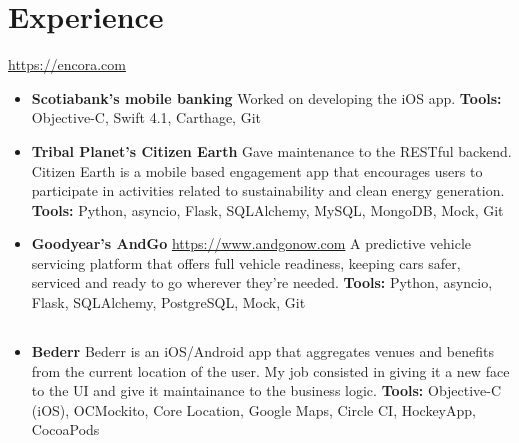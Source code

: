 \documentclass[11pt,a4paper,english]{moderncv}
\begin{document}
\maketitle

\section{Experience}

{
\url{https://encora.com}
\newline{}
\begin{itemize}
    \item \textbf{Scotiabank's mobile banking}
        \newline{}
	    Worked on developing the iOS app.
        \newline{}
        \textbf{Tools:} Objective-C, Swift 4.1, Carthage, Git
    \item \textbf{Tribal Planet's Citizen Earth}
        \newline{}
        Gave maintenance to the RESTful backend. Citizen Earth is a mobile based engagement app that encourages users to participate in activities related to sustainability and clean energy generation.
        \newline{}
        \textbf{Tools:} Python, asyncio, Flask, SQLAlchemy, MySQL, MongoDB, Mock, Git
    \item \textbf{Goodyear's AndGo}
        \newline{}
        \url{https://www.andgonow.com}
        \newline{}
        A predictive vehicle servicing platform that offers full vehicle readiness, keeping cars safer, serviced and ready to go wherever they’re needed.
        \newline{}
        \textbf{Tools:} Python, asyncio, Flask, SQLAlchemy, PostgreSQL, Mock, Git
\end{itemize}
}

\subsection{}

{
\begin{itemize}
    \item \textbf{Bederr}
        \newline{}
        Bederr is an iOS/Android app that aggregates venues and benefits from the current location of the user. My job consisted in giving it a new face to the UI and give it maintainance to the business logic.
        \newline{}
        \textbf{Tools:} Objective-C (iOS), OCMockito, Core Location, Google Maps, Circle CI, HockeyApp, CocoaPods
\end{itemize}
}
\end{document}

